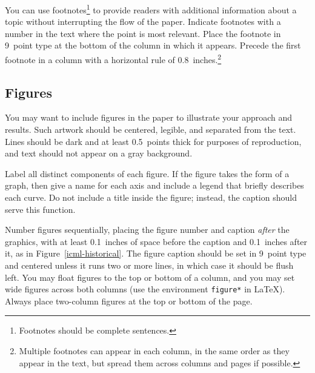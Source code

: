 \documentclass{article}
\begin{document}
You can use footnotes\footnote{Footnotes
should be complete sentences.} to provide readers with additional
information about a topic without interrupting the flow of the paper.
Indicate footnotes with a number in the text where the point is most
relevant. Place the footnote in 9~point type at the bottom of the
column in which it appears. Precede the first footnote in a column
with a horizontal rule of 0.8~inches.\footnote{Multiple footnotes can
appear in each column, in the same order as they appear in the text,
but spread them across columns and pages if possible.}


\subsection{Figures}

You may want to include figures in the paper to illustrate
your approach and results. Such artwork should be centered,
legible, and separated from the text. Lines should be dark and at
least 0.5~points thick for purposes of reproduction, and text should
not appear on a gray background.

Label all distinct components of each figure. If the figure takes the
form of a graph, then give a name for each axis and include a legend
that briefly describes each curve. Do not include a title inside the
figure; instead, the caption should serve this function.

Number figures sequentially, placing the figure number and caption
\emph{after} the graphics, with at least 0.1~inches of space before
the caption and 0.1~inches after it, as in
Figure~\ref{icml-historical}. The figure caption should be set in
9~point type and centered unless it runs two or more lines, in which
case it should be flush left. You may float figures to the top or
bottom of a column, and you may set wide figures across both columns
(use the environment \texttt{figure*} in \LaTeX). Always place
two-column figures at the top or bottom of the page.
\end{document}
